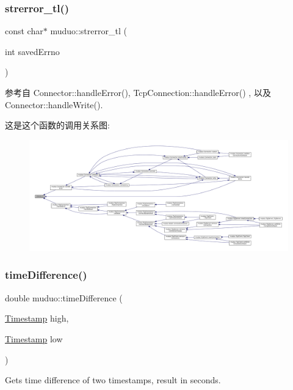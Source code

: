\subsubsection{\texorpdfstring{strerror\+\_\+tl()}{strerror\_tl()}}
{\footnotesize\ttfamily const char$\ast$ muduo\+::strerror\+\_\+tl (\begin{DoxyParamCaption}\item[{int}]{saved\+Errno }\end{DoxyParamCaption})}



参考自 Connector\+::handle\+Error(), Tcp\+Connection\+::handle\+Error() , 以及 Connector\+::handle\+Write().

这是这个函数的调用关系图\+:
\nopagebreak
\begin{figure}[H]
\begin{center}
\leavevmode
\includegraphics[width=350pt]{namespacemuduo_a8c7278edf83f347bacf79e36689bf91c_icgraph}
\end{center}
\end{figure}
\mbox{\label{namespacemuduo_a6f7c17d86f2474f297b3b9e54b500907}} 
\subsubsection{\texorpdfstring{time\+Difference()}{timeDifference()}}
{\footnotesize\ttfamily double muduo\+::time\+Difference (\begin{DoxyParamCaption}\item[{\hyperlink{classmuduo_1_1Timestamp}{Timestamp}}]{high,  }\item[{\hyperlink{classmuduo_1_1Timestamp}{Timestamp}}]{low }\end{DoxyParamCaption})\hspace{0.3cm}{\ttfamily [inline]}}

Gets time difference of two timestamps, result in seconds.


